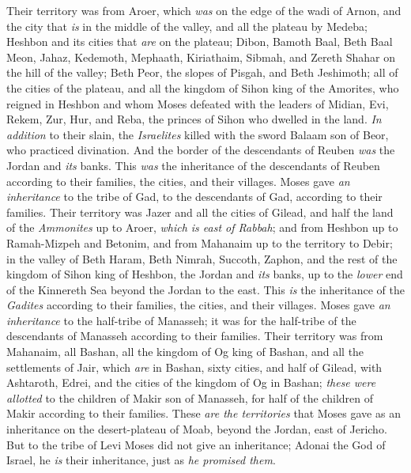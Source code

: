 \begin{biblechapter}
\verse Their territory was from Aroer, which \textit{was} on the edge of the wadi of Arnon, and the city that \textit{is} in the middle of the valley, and all the plateau by Medeba;
\verse Heshbon and its cities that \textit{are} on the plateau; Dibon, Bamoth Baal, Beth Baal Meon,
\verse Jahaz, Kedemoth, Mephaath,
\verse Kiriathaim, Sibmah, and Zereth Shahar on the hill of the valley;
\verse Beth Peor, the slopes of Pisgah, and Beth Jeshimoth;
\verse all of the cities of the plateau, and all the kingdom of Sihon king of the Amorites, who reigned in Heshbon and whom Moses defeated with the leaders of Midian, Evi, Rekem, Zur, Hur, and Reba, the princes of Sihon who dwelled in the land.
\verse \textit{In addition} to their slain, the \textit{Israelites} killed with the sword Balaam son of Beor, who practiced divination.
\verse And the border of the descendants of Reuben \textit{was} the Jordan and \textit{its} banks. This \textit{was} the inheritance of the descendants of Reuben according to their families, the cities, and their villages.
 Moses gave \textit{an inheritance} to the tribe of Gad, to the descendants of Gad, according to their families.
\verse Their territory was Jazer and all the cities of Gilead, and half the land of the \textit{Ammonites} up to Aroer, \textit{which is east of Rabbah};
\verse and from Heshbon up to Ramah-Mizpeh and Betonim, and from Mahanaim up to the territory to Debir;
\verse in the valley of Beth Haram, Beth Nimrah, Succoth, Zaphon, and the rest of the kingdom of Sihon king of Heshbon, the Jordan and \textit{its} banks, up to the \textit{lower} end of the Kinnereth Sea beyond the Jordan to the east.
\verse This \textit{is} the inheritance of the \textit{Gadites} according to their families, the cities, and their villages.
 Moses gave \textit{an inheritance} to the half-tribe of Manasseh; it was for the half-tribe of the descendants of Manasseh according to their families.
\verse Their territory was from Mahanaim, all Bashan, all the kingdom of Og king of Bashan, and all the settlements of Jair, which \textit{are} in Bashan, sixty cities,
\verse and half of Gilead, with Ashtaroth, Edrei, and the cities of the kingdom of Og in Bashan; \textit{these were allotted} to the children of Makir son of Manasseh, for half of the children of Makir according to their families.
\verse These \textit{are the territories} that Moses gave as an inheritance on the desert-plateau of Moab, beyond the Jordan, east of Jericho.
\verse But to the tribe of Levi Moses did not give an inheritance; Adonai the God of Israel, he \textit{is} their inheritance, just as \textit{he promised them}.
\end{biblechapter}

